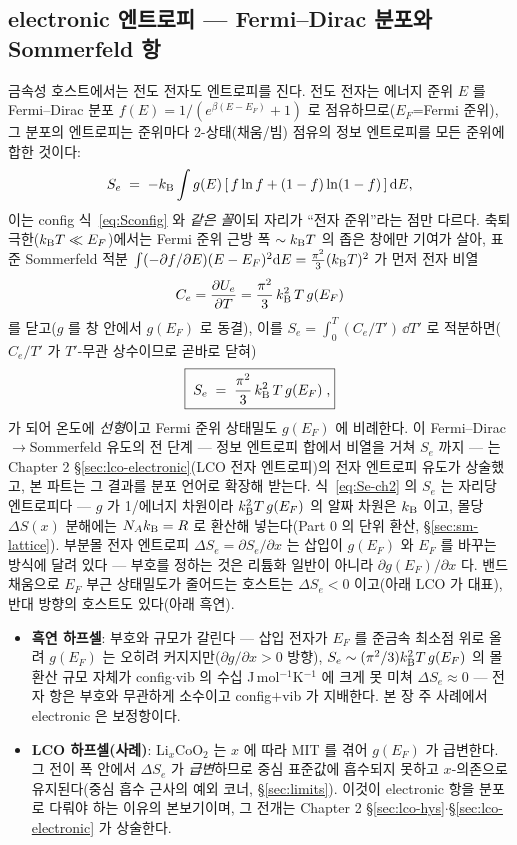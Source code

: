 \subsection{electronic 엔트로피 --- Fermi--Dirac 분포와 Sommerfeld 항}\label{ssec:elec}
금속성 호스트에서는 전도 전자도 엔트로피를 진다. 전도 전자는 에너지 준위 $E$ 를 Fermi--Dirac 분포
$f(E)=1/(e^{\beta(E-E_F)}+1)$ 로 점유하므로($E_F$=Fermi 준위), 그 분포의 엔트로피는 준위마다 2-상태(채움/빔)
점유의 정보 엔트로피를 모든 준위에 합한 것이다:
\begin{equation}
S_e \;=\; -k_{\mathrm B}\int g(E)\,[\,f\ln f+(1-f)\ln(1-f)\,]\,\mathrm{d} E,
\label{eq:Se_start}
\end{equation}
이는 config 식~\eqref{eq:Sconfig} 와 \emph{같은 꼴}이되 자리가 ``전자 준위''라는 점만 다르다. 축퇴 극한($k_{\mathrm B}
T\ll E_F$)에서는 Fermi 준위 근방 폭 $\sim k_{\mathrm B} T$ 의 좁은 창에만 기여가 살아, 표준 Sommerfeld 적분
$\int(-\partial f/\partial E)(E-E_F)^2\mathrm{d} E=\tfrac{\pi^2}{3}(k_{\mathrm B} T)^2$ 가 먼저 전자 비열
\[
C_e=\frac{\partial U_e}{\partial T}=\frac{\pi^2}{3}\,k_{\mathrm B}^2\,T\,g(E_F)
\]
를 닫고($g$ 를 창 안에서 $g(E_F)$ 로 동결), 이를 $S_e=\int_0^T (C_e/T')\,\dd T'$ 로 적분하면($C_e/T'$ 가
$T'$-무관 상수이므로 곧바로 닫혀)
\begin{equation}
\boxed{\;S_e \;=\; \frac{\pi^2}{3}\,k_{\mathrm B}^2\,T\,g(E_F)\;,}
\label{eq:Se-ch2}
\end{equation}
가 되어 온도에 \emph{선형}이고 Fermi 준위 상태밀도 $g(E_F)$ 에 비례한다. 이 Fermi--Dirac$\to$Sommerfeld
유도의 전 단계 --- 정보 엔트로피 합에서 비열을 거쳐 $S_e$ 까지 --- 는 Chapter 2 \S\ref{sec:lco-electronic}(LCO 전자 엔트로피)의 전자
엔트로피 유도가 상술했고, 본 파트는 그 결과를 분포 언어로 확장해 받는다. 식~\eqref{eq:Se-ch2} 의 $S_e$ 는 자리당
엔트로피다 --- $g$ 가 1/에너지 차원이라 $k_{\mathrm B}^2 T\,g(E_F)$ 의 알짜 차원은 $k_{\mathrm B}$ 이고, 몰당 $\Delta S(x)$ 분해에는
$N_Ak_{\mathrm B}=R$ 로 환산해 넣는다(Part 0 의 단위 환산, \S\ref{sec:sm-lattice}). 부분몰 전자 엔트로피 $\Delta S_e=\partial S_e/\partial x$
는 삽입이 $g(E_F)$ 와 $E_F$ 를 바꾸는 방식에 달려 있다 --- 부호를 정하는 것은 리튬화 일반이 아니라
$\partial g(E_F)/\partial x$ 다. 밴드 채움으로 $E_F$ 부근 상태밀도가 줄어드는 호스트는 $\Delta S_e<0$
이고(아래 LCO 가 대표), 반대 방향의 호스트도 있다(아래 흑연).
\begin{itemize}[leftmargin=1.4em,itemsep=1pt]
\item \textbf{흑연 하프셀}: 부호와 규모가 갈린다 --- 삽입 전자가 $E_F$ 를 준금속 최소점 위로 올려
$g(E_F)$ 는 오히려 커지지만($\partial g/\partial x>0$ 방향), $S_e\sim(\pi^2/3)k_{\mathrm B}^2T\,g(E_F)$ 의 몰 환산
규모 자체가 config$\cdot$vib 의 수십 J\,mol$^{-1}$K$^{-1}$ 에 크게 못 미쳐 $\Delta S_e\approx0$ --- 전자
항은 부호와 무관하게 소수이고 config$+$vib 가 지배한다. 본 장 주 사례에서 electronic 은 보정항이다.
\item \textbf{LCO 하프셀(사례)}: Li$_x$CoO$_2$ 는 $x$ 에 따라 MIT 를 겪어 $g(E_F)$ 가 급변한다. 그 전이 폭
안에서 $\Delta S_e$ 가 \emph{급변}하므로 중심 표준값에 흡수되지 못하고 $x$-의존으로 유지된다(중심 흡수 근사의
예외 코너, \S\ref{sec:limits}). 이것이 electronic 항을 분포로 다뤄야 하는 이유의 본보기이며, 그 전개는
Chapter 2 \S\ref{sec:lco-hys}$\cdot$\S\ref{sec:lco-electronic} 가 상술한다.
\end{itemize}


